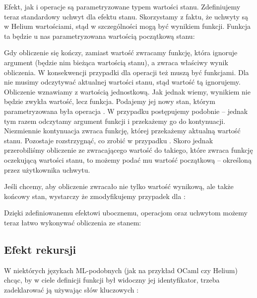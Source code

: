 

Efekt, jak i operacje są parametryzowane typem wartości stanu. Zdefiniujemy teraz standardowy uchwyt dla efektu stanu. Skorzystamy z faktu, że uchwyty są w Helium wartościami, stąd w szczególności mogą być wynikiem funkcji. Funkcja ta będzie u nas parametryzowana wartością początkową stanu:



Gdy obliczenie się kończy, zamiast wartość zwracamy funkcję, która ignoruje argument (będzie nim bieżąca wartością stanu), a zwraca właściwy wynik obliczenia. W konsekwencji przypadki dla operacji też muszą być funkcjami. Dla  nie musimy odczytywać aktualnej wartości stanu, stąd wartość tą ignorujemy. Obliczenie wznawiamy z wartością jednostkową. Jak jednak wiemy, wynikiem nie będzie zwykła wartość, lecz funkcja. Podajemy jej nowy stan, którym parametryzowana była operacja . W przypadku  postępujemy podobnie -- jednak tym razem odczytamy argument funkcji i przekażemy go do kontynuacji. Niezmiennie kontynuacja zwraca funkcję, której przekażemy aktualną wartość stanu. Pozostaje rozstrzygnąć, co zrobić w przypadku . Skoro jednak przerobiliśmy obliczenie ze zwracającego wartość do takiego, które zwraca funkcję oczekującą wartości stanu, to możemy podać mu wartość początkową -- określoną przez użytkownika uchwytu.

Jeśli chcemy, aby obliczenie zwracało nie tylko wartość wynikową, ale także końcowy stan, wystarczy że zmodyfikujemy przypadek dla :



Dzięki zdefiniowanemu efektowi ubocznemu, operacjom oraz uchwytom możemy teraz łatwo wykonywać obliczenia ze stanem:


\pagebreak


\subsection{Efekt rekursji}

W niektórych językach ML-podobnych (jak na przykład OCaml czy Helium) chcąc, by w ciele definicji funkcji był widoczny jej identyfikator, trzeba zadeklarować ją używając słów kluczowych :

